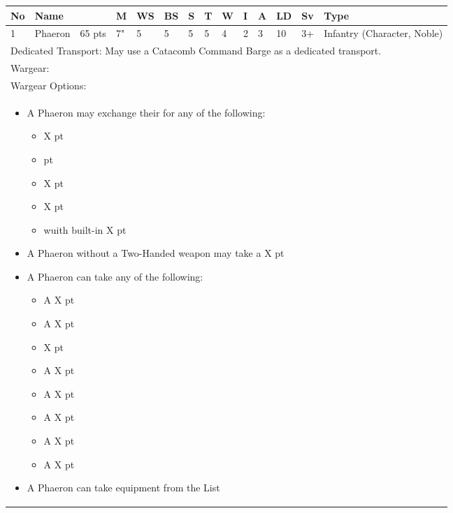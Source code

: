 \noindent
\begin{tabular}{||m{10pt} m{95pt} m{30pt} m{11pt} m{11pt} m{11pt} m{11pt} m{11pt} m{11pt} m{11pt} m{11pt} m{11pt} m{11pt} m{125pt}||}
	\hline
	No & Name & & M & WS & BS & S & T & W & I & A & LD & Sv & Type \\
	\hline
	1 & Phaeron & 65 pts & 7" & 5 & 5 & 5 & 5 & 4 & 2 & 3 & 10 & 3+ & Infantry (Character, Noble)\\
	\hline
	\hline	
	\multicolumn{14}{||Z{532 pt}||}{Dedicated Transport: May use a Catacomb Command Barge as a dedicated transport.}\\	
	\hline
	\hline
	\multicolumn{14}{||Z{532 pt}||}{Wargear: \quickref{Staff of Light}}\\
	\multicolumn{14}{||Z{532 pt}||}{Wargear Options:} \\	
	\multicolumn{14}{||Z{532 pt}||}{\begin{itemize}
			\item A Phaeron may exchange their \quickref{Staff of Light} for any of the following:
			\begin{itemize}
				\item \quickref{Hyperphase Sword} \hrulefill X pt
				\item \quickref{Voidblade} \hrulefill 0 pt
				\item \quickref{Voidscythe} \hrulefill X pt
				\item \quickref{Warscythe} \hrulefill X pt
				\item \quickref{Warscythe} wuith built-in \quickref{Relic Gauss Blaster} \hrulefill X pt
			\end{itemize}
			\item A Phaeron without a Two-Handed weapon may take a \quickref{Dispersion Shield} \hrulefill X pt
			\item A Phaeron can take any of the following:
			\begin{itemize}
				\item A \quickref{Gauntlet of Fire} \hrulefill X pt
				\item A \quickref{Tachyon Arrow} \hrulefill X pt
				\item \quickref{Mindshackle Scarabs} \hrulefill X pt
				\item A \quickref{Phase Shifter} \hrulefill X pt
				\item A \quickref{Phylactery} \hrulefill X pt
				\item A \quickref{Sempiternal Weave} \hrulefill X pt
				\item A \quickref{Resurrection Orb} \hrulefill X pt
				\item A \quickref{Tesseract Labyrinth} \hrulefill X pt
			\end{itemize}
			\item A Phaeron can take equipment from the \quickref{Artefacts of the Aeons} List
	\end{itemize}} \\	
	\hline
\end{tabular}

